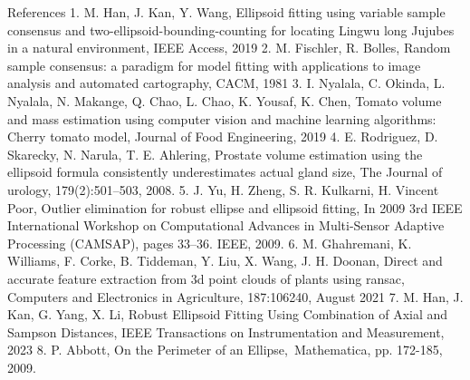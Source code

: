 References
    1. M. Han, J. Kan, Y. Wang, Ellipsoid fitting using variable sample consensus and two-ellipsoid-bounding-counting for locating Lingwu long Jujubes in a natural environment, IEEE Access, 2019
    2. M. Fischler, R. Bolles, Random sample consensus: a paradigm for model fitting with applications to image analysis and automated cartography, CACM, 1981
    3. I. Nyalala, C. Okinda, L. Nyalala, N. Makange, Q. Chao, L. Chao, K. Yousaf, K. Chen, Tomato volume and mass estimation using computer vision and machine learning algorithms: Cherry tomato model, Journal of Food Engineering, 2019
    4. E. Rodriguez, D. Skarecky, N. Narula, T. E. Ahlering, Prostate volume estimation using the ellipsoid formula consistently underestimates actual gland size, The Journal of urology, 179(2):501–503, 2008.
    5. J. Yu, H. Zheng, S. R. Kulkarni, H. Vincent Poor, Outlier elimination for robust ellipse and ellipsoid fitting, In 2009 3rd IEEE International Workshop on Computational Advances in Multi-Sensor Adaptive Processing (CAMSAP), pages 33–36. IEEE, 2009.
    6. M. Ghahremani, K. Williams, F. Corke, B. Tiddeman, Y. Liu, X. Wang, J. H. Doonan, Direct and accurate feature extraction from 3d point clouds of plants using ransac, Computers and Electronics in Agriculture, 187:106240, August 2021
    7. M. Han, J. Kan, G. Yang, X. Li, Robust Ellipsoid Fitting Using Combination of Axial and Sampson Distances, IEEE Transactions on Instrumentation and Measurement, 2023
    8. P. Abbott, On the Perimeter of an Ellipse, Mathematica, pp. 172-185, 2009.




